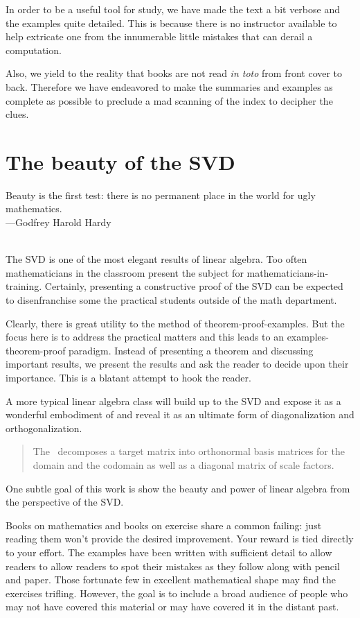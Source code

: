 \begin{thepreface}
In order to be a useful tool for study, we have made the text a bit verbose and the examples quite detailed. This is because there is no instructor available to help extricate one from the innumerable little mistakes that can derail a computation.

Also, we yield to the reality that books are not read \emph{in toto} from front cover to back. Therefore we have endeavored to make the summaries and examples as complete as possible to preclude a mad scanning of the index to decipher the clues.

\section*{The beauty of the SVD}
\begin{chapterquote}[20pt]
Beauty is the first test: there is no permanent place in the world for ugly mathematics. \\
---{\upshape Godfrey Harold Hardy }
\end{chapterquote}
\ \\

The SVD is one of the most elegant results of linear algebra. Too often mathematicians in the classroom present the subject for mathematicians-in-training. Certainly, presenting a constructive proof of the SVD can be expected to disenfranchise some the practical students outside of the math department.

Clearly, there is great utility to the method of theorem-proof-examples. But the focus here is to address the practical matters  and this leads to an examples-theorem-proof paradigm. Instead of presenting a theorem and discussing important results, we present the results and ask the reader to decide upon their importance. This is a blatant attempt to hook the reader.

A more typical linear algebra class will build up to the SVD and expose it as a wonderful embodiment of \ftola and reveal it as an ultimate form of diagonalization and orthogonalization. 


\begin{quote}
The \svdl \ decomposes a target matrix into orthonormal basis matrices for the domain and the codomain as well as a diagonal matrix of scale factors.
\end{quote}

One subtle goal of this work is show the beauty and power of linear algebra from the perspective of the SVD.

Books on mathematics and books on exercise share a common failing: just reading them won't provide the desired improvement. Your reward is tied directly to your effort. The examples have been written with sufficient detail to allow readers to allow readers to spot their mistakes as they follow along with pencil and paper. Those fortunate few in excellent mathematical shape may find the exercises trifling. However, the goal is to include a broad audience of people who may not have covered this material or may have covered it in the distant past.

\end{thepreface}

\endinput